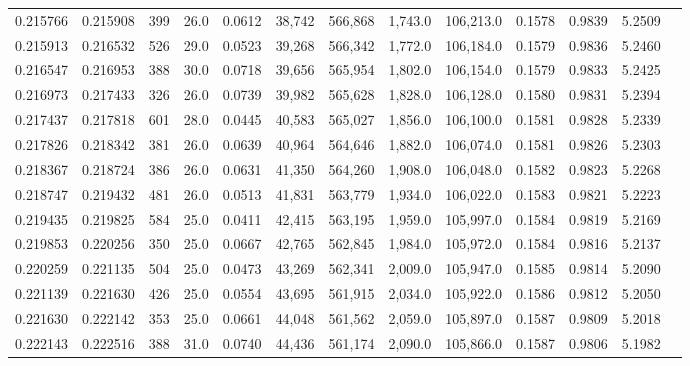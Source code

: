 \begin{tabular}{rrrrrrrrrrrrr}
0.215766 & 0.215908 &   399 & 26.0 &                                     0.0612 &  38,742 & 566,868 &   1,743.0 & 106,213.0 & 0.1578 & 0.9839 & 5.2509 \\
0.215913 & 0.216532 &   526 & 29.0 &                                     0.0523 &  39,268 & 566,342 &   1,772.0 & 106,184.0 & 0.1579 & 0.9836 & 5.2460 \\
0.216547 & 0.216953 &   388 & 30.0 &                                     0.0718 &  39,656 & 565,954 &   1,802.0 & 106,154.0 & 0.1579 & 0.9833 & 5.2425 \\
0.216973 & 0.217433 &   326 & 26.0 &                                     0.0739 &  39,982 & 565,628 &   1,828.0 & 106,128.0 & 0.1580 & 0.9831 & 5.2394 \\
0.217437 & 0.217818 &   601 & 28.0 &                                     0.0445 &  40,583 & 565,027 &   1,856.0 & 106,100.0 & 0.1581 & 0.9828 & 5.2339 \\
0.217826 & 0.218342 &   381 & 26.0 &                                     0.0639 &  40,964 & 564,646 &   1,882.0 & 106,074.0 & 0.1581 & 0.9826 & 5.2303 \\
0.218367 & 0.218724 &   386 & 26.0 &                                     0.0631 &  41,350 & 564,260 &   1,908.0 & 106,048.0 & 0.1582 & 0.9823 & 5.2268 \\
0.218747 & 0.219432 &   481 & 26.0 &                                     0.0513 &  41,831 & 563,779 &   1,934.0 & 106,022.0 & 0.1583 & 0.9821 & 5.2223 \\
0.219435 & 0.219825 &   584 & 25.0 &                                     0.0411 &  42,415 & 563,195 &   1,959.0 & 105,997.0 & 0.1584 & 0.9819 & 5.2169 \\
0.219853 & 0.220256 &   350 & 25.0 &                                     0.0667 &  42,765 & 562,845 &   1,984.0 & 105,972.0 & 0.1584 & 0.9816 & 5.2137 \\
0.220259 & 0.221135 &   504 & 25.0 &                                     0.0473 &  43,269 & 562,341 &   2,009.0 & 105,947.0 & 0.1585 & 0.9814 & 5.2090 \\
0.221139 & 0.221630 &   426 & 25.0 &                                     0.0554 &  43,695 & 561,915 &   2,034.0 & 105,922.0 & 0.1586 & 0.9812 & 5.2050 \\
0.221630 & 0.222142 &   353 & 25.0 &                                     0.0661 &  44,048 & 561,562 &   2,059.0 & 105,897.0 & 0.1587 & 0.9809 & 5.2018 \\
0.222143 & 0.222516 &   388 & 31.0 &                                     0.0740 &  44,436 & 561,174 &   2,090.0 & 105,866.0 & 0.1587 & 0.9806 & 5.1982 \\

\end{tabular}
